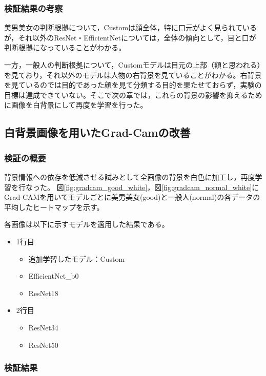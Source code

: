 \documentclass[a4paper,11pt,titlepage]{jsarticle}
\begin{document}
\subsubsection{検証結果の考察}
美男美女の判断根拠について，Customは顔全体，特に口元がよく見られているが，それ以外のResNet・EfficientNetについては，全体の傾向として，目と口が判断根拠になっていることがわかる。\par
一方，一般人の判断根拠について，Customモデルは目元の上部（額と思われる）を見ており，それ以外のモデルは人物の右背景を見ていることがわかる。右背景を見ているのでは目的であった顔を見て分類する目的を果たせておらず，実験の目標は達成できていない。そこで次の章では，これらの背景の影響を抑えるために画像を白背景にして再度を学習を行った。



\clearpage

\subsection{白背景画像を用いたGrad-Camの改善}
\subsubsection{検証の概要}

背景情報への依存を低減させる試みとして全画像の背景を白色に加工し，再度学習を行なった。
図\ref{fig:gradcam_good_white}，図\ref{fig:gradcam_normal_white}にGrad-CAMを用いてモデルごとに美男美女(good)と一般人(normal)の各データの平均したヒートマップを示す。

各画像は以下に示すモデルを適用した結果である。
\begin{itemize}
	\item 1行目
	\begin{itemize}
	\item 追加学習したモデル：Custom
	\item EfficientNet\_b0
	\item ResNet18
	\end{itemize}
	\item 2行目
	\begin{itemize}
	\item ResNet34
	\item ResNet50
	\end{itemize}
\end{itemize}


\subsubsection{検証結果}
\end{document}

